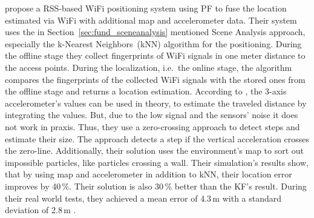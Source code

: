 \citet{wang:wlan} propose a \ac{RSS}-based WiFi positioning system using \ac{PF} to fuse the location estimated via WiFi with additional map and accelerometer data. Their system uses the in Section~\ref{sec:fund_sceneanalysis} mentioned Scene Analysis approach, especially the k-Nearest Neighbors~(kNN) algorithm for the positioning. During the offline stage they collect fingerprints of WiFi signals in one meter distance to the access points. During the localization, i.e.\ the online stage, the algorithm compares the fingerprints of the collected WiFi signals with the stored ones from the offline stage and returns a location estimation. According to \citet{wang:wlan}, the 3-axis accelerometer's values can be used in theory, to estimate the traveled distance by integrating the values. But, due to the low signal and the sensors' noise it does not work in praxis. Thus, they use a zero-crossing approach to detect steps and estimate their size. The approach detects a step if the vertical acceleration crosses the zero-line. Additionally, their solution uses the environment's map to sort out impossible particles, like particles crossing a wall.
Their simulation's results show, that by using map and accelerometer in addition to kNN, their location error improves by 40\,\%. Their solution is also 30\,\% better than the \ac{KF}'s result. During their real world tests, they achieved a mean error of 4.3\,m with a standard deviation of 2.8\,m \citep{wang:wlan}.

